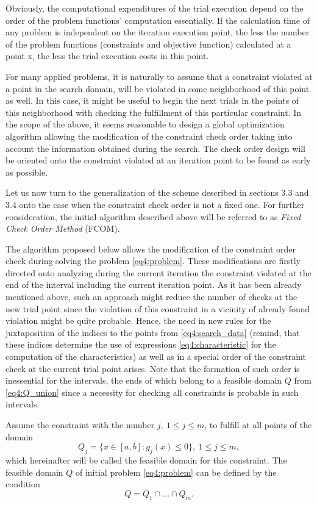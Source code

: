 \documentclass[graybox]{svmult}
\begin{document}
Obviously, the computational expenditures of the trial execution depend on the order of the problem functions’ computation essentially. If the calculation time of any problem is independent on the iteration execution point, the less the number of the problem functions (constraints and objective function) calculated at a point x, the less the trial execution costs in this point.

For many applied problems, it is naturally to assume that a constraint violated at a point in the search domain, will be violated in some neighborhood of this point as well. In this case, it might be useful to begin the next trials in the points of this neighborhood with checking the fulfillment of this particular constraint. In the scope of the above, it seems reasonable to design a global optimization algorithm allowing the modification of the constraint  check order taking into account the information obtained during the search. The check order design will be oriented onto the constraint violated at an iteration point to be found as early as possible.

Let us now turn to the generalization of the scheme described in sections 3.3 and 3.4 onto the case when the constraint check order is not a fixed one. For further consideration, the initial algorithm described above will be referred to as \emph{Fixed Check Order Method} (FCOM).

The algorithm proposed below allows the modification of the constraint order check during solving the problem \eqref{eq4:problem}. These modifications are firstly directed onto analyzing during the current iteration the constraint violated at the end of the interval including the current iteration point. As it has been already mentioned above, such an approach might reduce the number of checks at the new trial point since the violation of this constraint in a vicinity of already found violation might be quite probable. Hence, the need in new rules for the juxtaposition of the indices to the points from \eqref{eq4:search_data} (remind, that these indices determine the use of expressions \eqref{eq4:characteristic} for the computation of the characteristics) as well as in a special order
of the constraint check at the current trial point arises. Note that the formation of such order is inessential for the intervals, the ends of which belong to a feasible domain $Q$ from \eqref{eq4:Q_union} since a necessity for checking all constraints is probable in such intervals.

Assume the constraint with the number $j,\: 1\le j\le m$, to fulfill at all points of the domain
\begin{equation}
  Q_j=\{x\in[a,b]:g_j(x)\le 0\},\: 1\le j\le m,
\end{equation}
which hereinafter will be called the feasible domain for this constraint. The feasible domain $Q$ of initial problem \eqref{eq4:problem} can be defined by the condition
\begin{equation}
  \label{eq4:Q_union}
  Q=Q_1\cap\dots\cap Q_m.
\end{equation}
\end{document}
